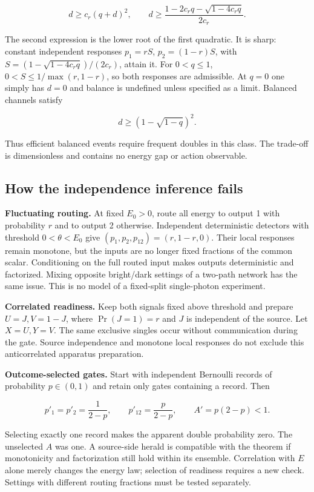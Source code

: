 \documentclass[11pt,a4paper]{article}
\begin{document}
\[d\ge c_r(q+d)^2,\qquad
 d\ge\frac{1-2c_rq-\sqrt{1-4c_rq}}{2c_r}.\]

The second expression is the lower root of the first quadratic. It is
sharp: constant independent responses \(p_1=rS\), \(p_2=(1-r)S\), with
\(S=(1-\sqrt{1-4c_rq})/(2c_r)\), attain it. For \(0<q\le1\),
\(0<S\le1/\max(r,1-r)\), so both responses are admissible. At \(q=0\)
one simply has \(d=0\) and balance is undefined unless specified as a
limit. Balanced channels satisfy

\[d\ge(1-\sqrt{1-q})^2.\]

Thus efficient balanced events require frequent doubles in this class.
The trade-off is dimensionless and contains no energy gap or action
observable.

\hypertarget{how-the-independence-inference-fails}{%
\subsection{How the independence inference
fails}\label{how-the-independence-inference-fails}}

\textbf{Fluctuating routing.} At fixed \(E_0>0\), route all energy to
output 1 with probability \(r\) and to output 2 otherwise. Independent
deterministic detectors with threshold \(0<\theta<E_0\) give
\((p_1,p_2,p_{12})=(r,1-r,0)\). Their local responses remain monotone,
but the inputs are no longer fixed fractions of the common scalar.
Conditioning on the full routed input makes outputs deterministic and
factorized. Mixing opposite bright/dark settings of a two-path network
has the same issue. This is no model of a fixed-split single-photon
experiment.

\textbf{Correlated readiness.} Keep both signals fixed above threshold
and prepare \(U=J,V=1-J\), where \(\Pr(J=1)=r\) and \(J\) is independent
of the source. Let \(X=U,Y=V\). The same exclusive singles occur without
communication during the gate. Source independence and monotone local
responses do not exclude this anticorrelated apparatus preparation.

\textbf{Outcome-selected gates.} Start with independent Bernoulli
records of probability \(p\in(0,1)\) and retain only gates containing a
record. Then

\[p'_1=p'_2=\frac1{2-p},\qquad p'_{12}=\frac p{2-p},\qquad
 A'=p(2-p)<1.\]

Selecting exactly one record makes the apparent double probability zero.
The unselected \(A\) was one. A source-side herald is compatible with
the theorem if monotonicity and factorization still hold within its
ensemble. Correlation with \(E\) alone merely changes the energy law;
selection of readiness requires a new check. Settings with different
routing fractions must be tested separately.
\end{document}
